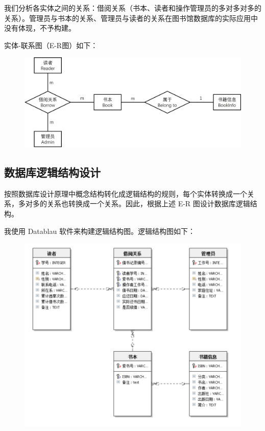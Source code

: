 \documentclass{article}
\begin{document}
我们分析各实体之间的关系：借阅关系（书本、读者和操作管理员的多对多对多的关系）。管理员与书本的关系、管理员与读者的关系在图书馆数据库的实际应用中没有体现，不予构建。

实体-联系图（E-R图）如下：

\newpage

\begin{figure}[!h]
\centering
\includegraphics[scale=0.5]{db_imgs/er.jpg}
\end{figure}

\subsection{数据库逻辑结构设计}

按照数据库设计原理中概念结构转化成逻辑结构的规则，每个实体转换成一个关系，多对多的关系也转换成一个关系。因此，根据上述 E-R 图设计数据库逻辑结构。

我使用 Datablau 软件来构建逻辑结构图。逻辑结构图如下：

\begin{figure}[!h]
\centering
\includegraphics[scale=0.75]{db_imgs/logic1.PNG}
\end{figure}
\end{document}
